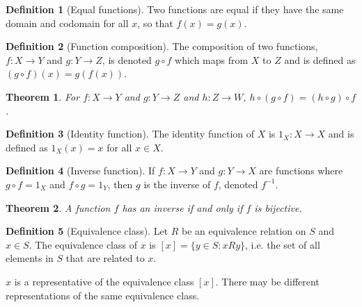 \documentclass{article}
\theoremstyle{plain}
\newtheorem{theorem}{Theorem}[section]
\numberwithin{theorem}{section}
\theoremstyle{definition}
\newtheorem{definition}{Definition}[section]
\numberwithin{definition}{section}
\begin{document}
%
\begin{definition}[Equal functions]
    Two functions are equal if they have the same domain and codomain
    for all $x$, so that $f(x) = g(x)$.
\end{definition}
%
\begin{definition}[Function composition]
    The composition of two functions, $f:X \to Y$ and $g:Y \to Z$,
    is denoted $g \circ f$ which maps from $X$ to $Z$ and is defined as
    $(g \circ f)(x) = g(f(x))$.
\end{definition}
%
\begin{theorem}
    For $f:X \to Y$ and $g:Y \to Z$ and  $h:Z \to W$,
    $h \circ (g \circ f) = (h \circ g) \circ f$.
\end{theorem}
%
\begin{definition}[Identity function]
    The identity function of $X$ is $1_X:X \to X$ and is defined as
    $1_X (x)=x$ for all $x \in X$.
\end{definition}
%
\begin{definition}[Inverse function]
    If $f:X \to Y$ and $g:Y \to X$ are functions where
    $g \circ f = 1_X$ and $f \circ g = 1_Y$,
    then $g$ is the inverse of $f$, denoted $f^{-1}$.
\end{definition}
%
\begin{theorem}
    A function $f$ has an inverse if and only if $f$ is bijective.
\end{theorem}
%
\begin{definition}[Equivalence class]
    Let $R$ be an equivalence relation on $S$ and $x \in S$.
    The equivalence class of $x$ is $[x] = \{y \in S : xRy\}$,
    i.e. the set of all elements in $S$ that are related to $x$.

    $x$ is a representative of the equivalence class $[x]$.
    There may be different representations of the same equivalence class.
\end{definition}
%
\end{document}
